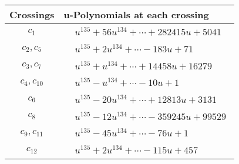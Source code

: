 \documentclass[1p]{elsarticle_modified}
\theoremstyle{definition}
\begin{document}
\begin{tabular}{m{50pt}|m{274pt}}
Crossings & \hspace{64pt}u-Polynomials at each crossing \\
\hline $$\begin{aligned}c_{1}\end{aligned}$$&$\begin{aligned}
&u^{135}+56 u^{134}+\cdots+282415 u+5041
\end{aligned}$\\
\hline $$\begin{aligned}c_{2},c_{5}\end{aligned}$$&$\begin{aligned}
&u^{135}+2 u^{134}+\cdots-183 u+71
\end{aligned}$\\
\hline $$\begin{aligned}c_{3},c_{7}\end{aligned}$$&$\begin{aligned}
&u^{135}+u^{134}+\cdots+14458 u+16279
\end{aligned}$\\
\hline $$\begin{aligned}c_{4},c_{10}\end{aligned}$$&$\begin{aligned}
&u^{135}- u^{134}+\cdots-10 u+1
\end{aligned}$\\
\hline $$\begin{aligned}c_{6}\end{aligned}$$&$\begin{aligned}
&u^{135}-20 u^{134}+\cdots+12813 u+3131
\end{aligned}$\\
\hline $$\begin{aligned}c_{8}\end{aligned}$$&$\begin{aligned}
&u^{135}-12 u^{134}+\cdots-359245 u+99529
\end{aligned}$\\
\hline $$\begin{aligned}c_{9},c_{11}\end{aligned}$$&$\begin{aligned}
&u^{135}-45 u^{134}+\cdots-76 u+1
\end{aligned}$\\
\hline $$\begin{aligned}c_{12}\end{aligned}$$&$\begin{aligned}
&u^{135}+2 u^{134}+\cdots-115 u+457
\end{aligned}$\\
\hline
\end{tabular}\\~\\
\end{document}
